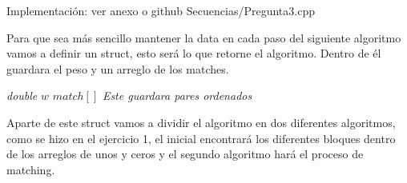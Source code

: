 \documentclass[12pt]{article}
\newcommand{\TITLE}[1]{\item[#1]}
\begin{document}
Implementación: ver anexo o github Secuencias/Pregunta3.cpp\vspace{5mm}

Para que sea más sencillo mantener la data en cada paso del siguiente algoritmo vamos a definir un struct, esto será lo que retorne el algoritmo. Dentro de él guardara el peso y un arreglo de los matches.

\begin{algorithmic}[1]
    \TITLE{\textsc{struct valores}}
    \STATE \textit{double} $w$
    \STATE $match[]$ \COMMENT \textit{Este guardara pares ordenados}
\end{algorithmic} \vspace{5mm}

Aparte de este struct vamos a dividir el algoritmo en dos diferentes algoritmos, como se hizo en el ejercicio 1, el inicial encontrará los diferentes bloques dentro de los arreglos de unos y ceros y el segundo algoritmo hará el proceso de matching.
\end{document}
